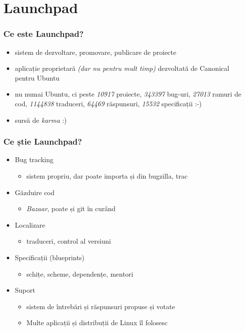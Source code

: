 \documentclass{beamer}
\begin{document}
\section{Launchpad}
\frame{\tableofcontents[currentsection]}

\begin{frame}
\frametitle{Ce este Launchpad?}
\begin{itemize}
\pause \item sistem de dezvoltare, promovare, publicare de proiecte
\pause \item aplicație proprietară \emph{(dar nu pentru mult timp)} dezvoltată de Canonical pentru Ubuntu
\pause \item nu numai Ubuntu, ci peste \emph{10917} proiecte, \emph{343397} bug-uri, \emph{27013} ramuri de cod, \emph{1144838} traduceri, \emph{64469} răspunsuri, \emph{15532} specificații :-)
\pause \item sursă de \emph{karma} :)
\end{itemize}
\end{frame} 

\begin{frame}
\frametitle{Ce știe Launchpad?}
\begin{itemize}
\pause \item Bug tracking
\begin{itemize}
\item sistem propriu, dar poate importa și din bugzilla, trac
\end{itemize}
\pause \item Găzduire cod 
\begin{itemize}
\item	\emph{Bazaar}, poate și git în curând
\end{itemize}
\pause \item Localizare
\begin{itemize}
\item traduceri, control al versiuni
\end{itemize}
\pause \item Specificații (blueprints)
\begin{itemize}
\item schițe, scheme, dependențe, mentori
\end{itemize}
\pause \item Suport
\begin{itemize}
\item sistem de întrebări și răspunsuri propuse și votate
\newline
\item Multe aplicații și distribuții de Linux îl folosesc %
\end{itemize}
\end{itemize}
\end{frame}
\end{document}
